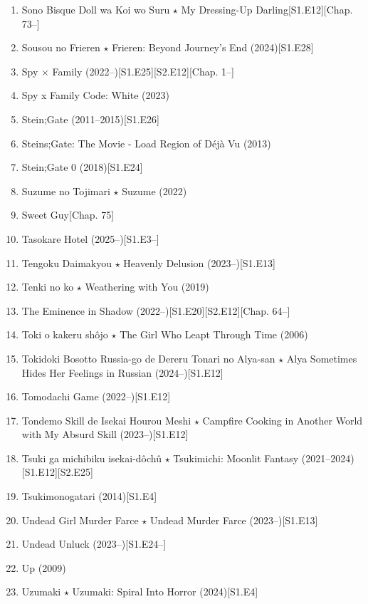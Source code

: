 \documentclass{article}
\begin{document}
\begin{enumerate}
    \item Sono Bisque Doll wa Koi wo Suru $\star$ My Dressing-Up Darling\hfill[S1.E12][Chap. 73--]
    \item {\sc Sousou no Frieren $\star$ Frieren: Beyond Journey's End} (2024)\hfill[S1.E28]
    \item {\sc Spy $\times$ Family} (2022--)\hfill[S1.E25][S2.E12][Chap. 1--]
    \item {\sc Spy x Family Code: White} (2023)
    \item {\sc Stein;Gate} (2011--2015)\hfill[S1.E26]
    \item {\sc Steins;Gate: The Movie - Load Region of Déjà Vu} (2013)
    \item {\sc Stein;Gate 0} (2018)\hfill[S1.E24]
    \item {\sc Suzume no Tojimari $\star$ Suzume} (2022)
    \item {\sc Sweet Guy}\hfill[Chap. 75]
    \item Tasokare Hotel (2025--)\hfill[S1.E3--]
    \item Tengoku Daimakyou $\star$ Heavenly Delusion (2023--)\hfill[S1.E13]
    \item {\sc Tenki no ko $\star$ Weathering with You} (2019)
    \item The Eminence in Shadow (2022--)\hfill[S1.E20][S2.E12][Chap. 64--]
    \item {\sc Toki o kakeru sh\^ojo $\star$ The Girl Who Leapt Through Time} (2006)
    \item {\sc Tokidoki Bosotto Russia-go de Dereru Tonari no Alya-san $\star$ Alya Sometimes Hides Her Feelings in Russian} (2024--)\hfill[S1.E12]
    \item {\sc Tomodachi Game} (2022--)\hfill[S1.E12]
    \item Tondemo Skill de Isekai Hourou Meshi $\star$ Campfire Cooking in Another World with My Absurd Skill (2023--)\hfill[S1.E12]
    \item {\sc Tsuki ga michibiku isekai-dôchû $\star$ Tsukimichi: Moonlit Fantasy} (2021--2024)\hfill[S1.E12][S2.E25]
    \item {\sc Tsukimonogatari} (2014)\hfill[S1.E4]
    \item {\sc Undead Girl Murder Farce $\star$ Undead Murder Farce} (2023--)\hfill[S1.E13]
    \item Undead Unluck (2023--)\hfill[S1.E24--]
    \item {\sc Up} (2009)
    \item {\sc Uzumaki $\star$ Uzumaki: Spiral Into Horror} (2024)\hfill[S1.E4]

\end{enumerate}
\end{document}
